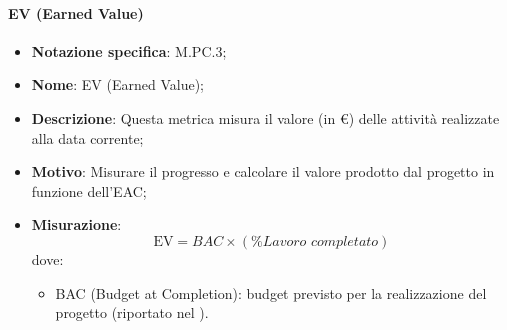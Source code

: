 \paragraph*{EV (Earned Value)}
\begin{itemize}
    \item \textbf{Notazione specifica}: M.PC.3;
    \item \textbf{Nome}: EV (Earned Value);
    \item \textbf{Descrizione}: Questa metrica misura il valore (in €) delle attività realizzate alla data corrente;
    \item \textbf{Motivo}: Misurare il progresso e calcolare il valore prodotto dal progetto in funzione dell'EAC;
    \item \textbf{Misurazione}:
    \[
        \text{EV} = \textit{BAC} \times (\% {\textit{Lavoro completato}})
    \]
    dove:
    \begin{itemize}
        \item BAC (Budget at Completion): budget previsto per la realizzazione del progetto (riportato nel \PianoDiProgetto).
    \end{itemize}
\end{itemize}

